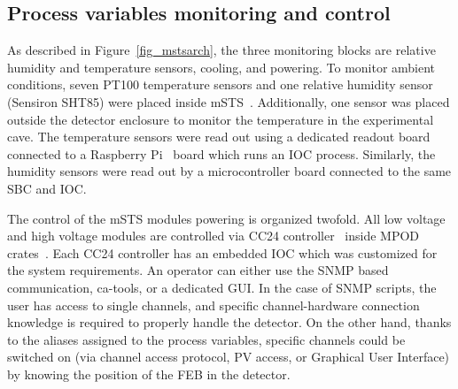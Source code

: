 \subsection{Process variables monitoring and control}
As described in Figure~\ref{fig_mstsarch}, the three monitoring blocks are relative humidity and temperature sensors, cooling, and powering. To monitor ambient conditions, seven PT100 temperature sensors and one relative humidity sensor (Sensiron SHT85) were placed inside \gls{mSTS}~\cite{SHT85}. Additionally, one sensor was placed outside the detector enclosure to monitor the temperature in the experimental cave. The temperature sensors were read out using a dedicated readout board connected to a Raspberry Pi~\cite{raspberry} board which runs an \gls{IOC} process. Similarly, the humidity sensors were read out by a microcontroller board connected to the same \gls{SBC} and \gls{IOC}.

The control of the \gls{mSTS} modules powering is organized twofold. All low voltage and high voltage modules are controlled via CC24 controller~\cite{cc24} inside MPOD crates~\cite{mpod}. Each CC24 controller has an embedded \gls{IOC} which was customized for the system requirements.  An operator can either use the \gls{SNMP} based communication, ca-tools, or a dedicated \gls{GUI}. In the case of SNMP scripts, the user has access to single channels, and specific channel-hardware connection knowledge is required to properly handle the detector. On the other hand, thanks to the aliases assigned to the process variables, specific channels could be switched on (via channel access protocol, PV access, or Graphical User Interface) by knowing the position of the \gls{FEB} in the detector.

